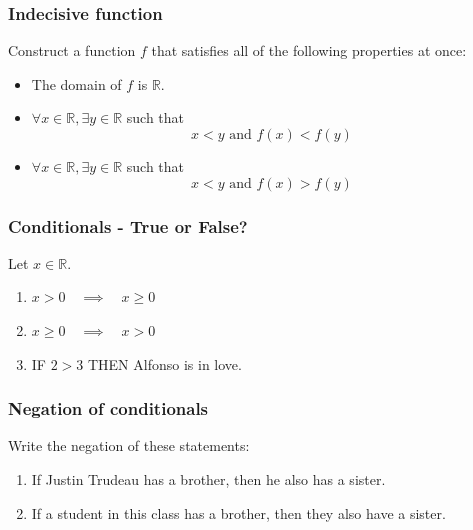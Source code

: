 \begin{frame}
	\frametitle{Indecisive function}

	Construct a function $f$ that satisfies all of the following properties at
	once:
	\begin{itemize}
		\item The domain of $f$ is $\mathbb{R}$.

		\item $\displaystyle \forall x \in \mathbb{R}, \exists y \in \mathbb{R}$ such
			that
			\[
				x<y \text{ and }f(x) < f(y)
			\]

		\item $\displaystyle \forall x \in \mathbb{R}, \exists y \in \mathbb{R}$ such
			that
			\[
				x<y \text{ and }f(x) > f(y)
			\]
	\end{itemize}
\end{frame}

\begin{frame}
	\frametitle{ Conditionals - True or False?}

	Let $\displaystyle x \in \mathbb{R}$.

	\begin{enumerate}
		\item $\displaystyle x > 0 \quad \implies \quad x \geq 0$

		\item $\displaystyle x \geq 0 \quad \implies \quad x > 0$

			\vfill

		\item IF $\displaystyle 2 > 3$ THEN Alfonso is in love.
	\end{enumerate}

	\vfill
\end{frame}

\begin{frame}
	\frametitle{Negation of conditionals}

	Write the negation of these statements:
	\begin{enumerate}
		\item If Justin Trudeau has a brother, then he also has a sister.

		\item If a student in this class has a brother, then they also have a sister.
	\end{enumerate}
\end{frame}

